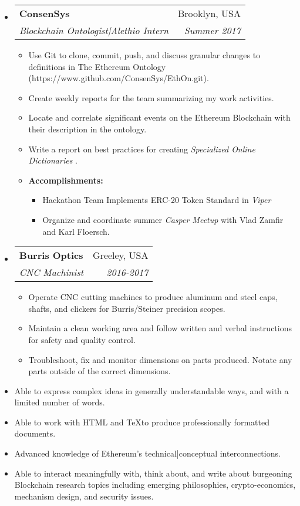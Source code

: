 \documentclass[letterpaper,10pt]{article}
\makeatletter
\newlength{\outerbordwidth}
\newcommand{\resitem}[1]{\item #1 \vspace{-2pt}}
\newcommand{\resheading}[1]{\vspace{8pt}
  \parbox{\textwidth}{\setlength{\FrameSep}{\outerbordwidth}
    \begin{shaded}
\setlength{\fboxsep}{0pt}\framebox[\textwidth][l]{\setlength{\fboxsep}{4pt}\fcolorbox{shadecolorB}{shadecolorB}{\textbf{\sffamily{\mbox{~}\makebox[6.762in][l]{\large #1} \vphantom{p\^{E}}}}}}
    \end{shaded}
  }\vspace{-5pt}
}
\newcommand{\ressubheading}[4]{
\begin{tabular*}{6.5in}{l@{\cftdotfill{\cftsecdotsep}\extracolsep{\fill}}r}
		\textbf{#1} & #2 \\
		\textit{#3} & \textit{#4} \\
\end{tabular*}\vspace{-6pt}}
\makeatother
\begin{document}
\begin{itemize}

	\item \ressubheading{ConsenSys}{Brooklyn, USA}{Blockchain Ontologist|Alethio Intern}{Summer 2017}

\begin{itemize}
	\resitem{Use Git to clone, commit, push, and discuss granular changes to definitions in The Ethereum Ontology (https://www.github.com/ConsenSys/EthOn.git).} 
	\resitem{Create weekly reports for the team summarizing my work activities.}
	\resitem{Locate and correlate significant events on the Ethereum Blockchain with their description in the ontology.}
	\resitem{Write a report on best practices for creating \textit{Specialized Online Dictionaries}}.
	\resitem{\textbf{Accomplishments:}}
		\begin{itemize}
				\resitem{Hackathon Team Implements ERC-20 Token Standard in \textit{Viper}}
				\resitem{Organize and coordinate summer \textit{Casper Meetup} with Vlad Zamfir and Karl Floersch.}
		\end{itemize}
\end{itemize}

\item \ressubheading{Burris Optics}{Greeley, USA}{CNC Machinist}{2016-2017}

	\begin{itemize}
		\resitem{Operate CNC cutting machines to produce aluminum and steel caps, shafts, and clickers for Burris/Steiner precision scopes.}
		\resitem{Maintain a clean working area and follow written and verbal instructions for safety and quality control.}
		\resitem{Troubleshoot, fix and monitor dimensions on parts produced. Notate any parts outside of the correct dimensions.}
	\end{itemize}

\end{itemize}


\resheading{Skills}

\begin{itemize}
	\resitem{Able to express complex ideas in generally understandable ways, and with a limited number of words.}
	\resitem{Able to work with \textsc{HTML} and \TeX to produce professionally formatted documents. }
	\resitem{Advanced knowledge of Ethereum's technical|conceptual interconnections.}
	\resitem{Able to interact meaningfully with, think about, and write about burgeoning Blockchain research topics including emerging philosophies, crypto-economics, mechanism design, and security issues.}
\end{itemize}
\end{document}

